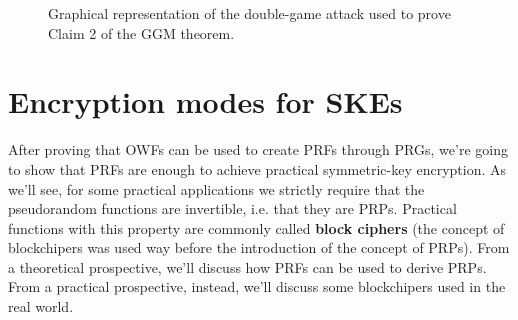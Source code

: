 \documentclass[a4paper, 12pt]{report}
\begin{document}
    \begin{figure}[H]
        \centering


        \caption{Graphical representation of the double-game attack used to prove Claim 2 of the GGM theorem.}
    \end{figure}

    \section{Encryption modes for SKEs}

    After proving that OWFs can be used to create PRFs through PRGs, we're going to show that PRFs are enough to achieve practical symmetric-key encryption. As we'll see, for some practical applications we strictly require that the pseudorandom functions are invertible, i.e. that they are PRPs. Practical functions with this property are commonly called \textbf{block ciphers} (the concept of blockchipers was used way before the introduction of the concept of PRPs). From a theoretical prospective, we'll discuss how PRFs can be used to derive PRPs. From a practical prospective, instead, we'll discuss some blockchipers used in the real world.
\end{document}
